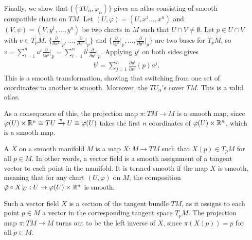 Finally, we show that $\{(TU_{\alpha},\tilde{\varphi}_{\alpha})\}$ gives an atlas consisting of smooth compatible charts on $TM$. Let $(U,\varphi) = (U,x^{1}\ldots,x^{n})$ and $(V,\psi) = (V,y^{1},\ldots,y^{n})$ be two charts in $M$ such that $U \cap V \neq \emptyset$. Let $p \in U \cap V$ with $v \in T_{p}M$. $\{\frac{\partial}{\partial x^{1}}\big|_{p},\ldots,\frac{\partial}{\partial x^{n}}\big|_{p}\}$ and $\{\frac{\partial}{\partial y^{1}}\big|_{p},\ldots,\frac{\partial}{\partial y^{n}}\big|_{p}\}$ are two bases for $T_{p}M$, so $v = \sum_{i=1}^{n} a^{i} \frac{\partial}{\partial x^{i}}\big|_{p} = \sum_{i=1}^{n} b^{i} \frac{\partial}{\partial y^{i}}\big|_{p}$. Applying $y^{i}$ on both sides gives
\begin{align}
    b^{i} = \sum_{j=1}^{n} \frac{\partial y^{i}}{\partial x^{j}}(p) a^{j}.
\end{align}
This is a smooth transformation, showing that switching from one set of coordinates to another is smooth. Moreover, the $TU_{\alpha}$'s cover $TM$. This is a valid atlas.

As a consequence of this, the projection map $\pi:TM \to M$ is a smooth map, since $\varphi(U) \times \mathbb{R}^{n} \cong TU \xrightarrow{\pi} U \cong \varphi(U)$ takes the first $n$ coordinates of $\varphi(U) \times \mathbb{R}^{n}$, which is a smooth map.

\begin{definition}
    A  $X$ on a smooth manifold $M$ is a map $X:M \to TM$ such that $X(p) \in T_{p}M$ for all $p \in M$. In other words, a vector field is a smooth assignment of a tangent vector to each point in the manifold. It is termed smooth if the map $X$ is smooth, meaning that for any chart $(U,\varphi)$ on $M$, the composition $\tilde{\varphi} \circ X|_{U}: U \to \varphi(U) \times \mathbb{R}^{n}$ is smooth.
\end{definition}
Such a vector field $X$ is a section of the tangent bundle $TM$, as it assigns to each point $p \in M$ a vector in the corresponding tangent space $T_{p}M$. The projection map $\pi:TM \to M$ turns out to be the left inverse of $X$, since $\pi(X(p)) = p$ for all $p \in M$.


